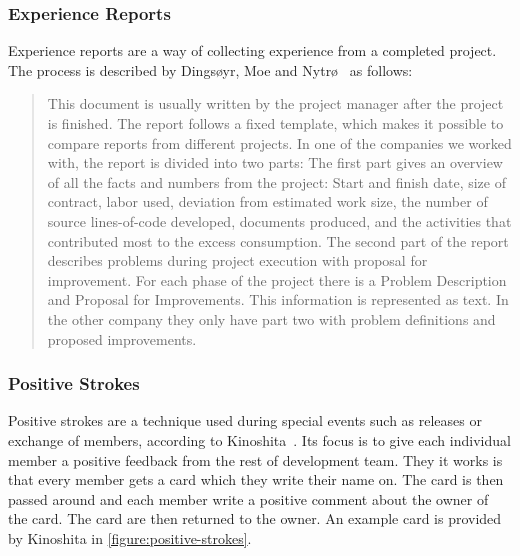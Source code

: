 \documentclass[12pt]{article}
\begin{document}
\subsubsection{Experience Reports}\label{experience-reports}
Experience reports are a way of collecting experience from a completed project. The process is described by Dingsøyr, Moe and Nytrø~\cite{Moe2001} as follows: 

\begin{quote} This document is usually written by the project manager after the project is
finished. The report follows a fixed template, which makes it possible to compare
reports from different projects. In one of the companies we worked with, the report is
divided into two parts: The first part gives an overview of all the facts and numbers
from the project: Start and finish date, size of contract, labor used, deviation from
estimated work size, the number of source lines-of-code developed, documents
produced, and the activities that contributed most to the excess consumption. The
second part of the report describes problems during project execution with proposal
for improvement. For each phase of the project there is a Problem Description and
Proposal for Improvements. This information is represented as text. In the other
company they only have part two with problem definitions and proposed
improvements.
\end{quote}


\subsubsection{Positive Strokes}
Positive strokes are a technique used during special events such as releases or exchange of members, according to Kinoshita~\cite{Kinoshita2008}. Its focus is to give each individual member a positive feedback from the rest of development team. They it works is that every member gets a card which they write their name on. The card is then passed around and each member write a positive comment about the owner of the card. The card are then returned to the owner. An example card is provided by Kinoshita in \autoref{figure:positive-strokes}.
\end{document}

